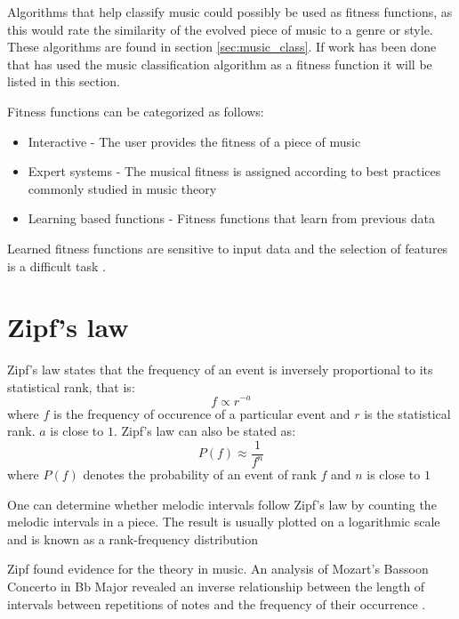 
Algorithms that help classify music could possibly be used as fitness functions, as this would rate the similarity of the evolved piece of music to a genre or style. These algorithms are found in section \ref{sec:music_class}.
If work has been done that has used the music classification algorithm as a fitness function it will be listed in this section.

Fitness functions can be categorized as follows:
\begin{itemize}
\item Interactive - The user provides the fitness of a piece of music
\item Expert systems - The musical fitness is assigned according to best practices commonly studied in music theory
\item Learning based functions - Fitness functions that learn from previous data
\end{itemize}

Learned fitness functions are sensitive to input data and the selection of features is a difficult task \cite{Dostal2013}.


\section{Zipf's law} \label{sec:zipfs_fitness}
Zipf's law states that the frequency of an event is inversely proportional to its statistical rank, that is:
\[ f \propto r^{-a} \]
where $f$ is the frequency of occurence of a particular event and $r$ is the statistical rank. $a$ is close to $1$.
Zipf's law can also be stated as:
\[ P(f) \approx \frac{1}{f^n}\]
where $P(f)$ denotes the probability of an event of rank $f$ and $n$ is close to $1$

One can determine whether melodic intervals follow Zipf's law by counting the melodic intervals in a piece. The result is usually plotted on a logarithmic scale and is known as a rank-frequency distribution

Zipf found evidence for the theory in music. An analysis of Mozart's Bassoon Concerto in Bb Major revealed an inverse relationship between the length of intervals between repetitions of notes and the frequency of their occurrence \cite{zipf1949human}.

